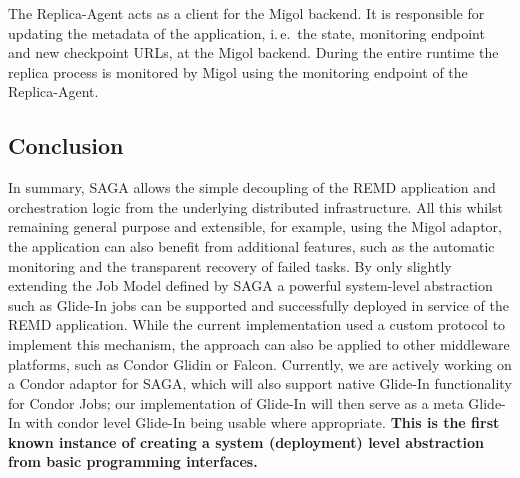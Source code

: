 \documentclass{rspublic}
\newcommand{\glidein}[1]{Glide-In }
\newcommand{\replicaagent}[1]{Replica-Agent }
\begin{document}
The \replicaagent\ acts as a client for the Migol
backend. It is responsible for updating the metadata of the
application, i.\,e.\ the state, monitoring endpoint and new checkpoint
URLs, at the Migol backend. During the entire runtime the replica
process is monitored by Migol using the monitoring endpoint of the
Replica-Agent.
                           

               
\subsection{Conclusion}
In summary, SAGA allows the simple decoupling of the REMD application
and orchestration logic from the underlying distributed
infrastructure. All this whilst remaining general purpose and
extensible, for example, using the Migol adaptor, the application can
also benefit from additional features, such as the automatic
monitoring and the transparent recovery of failed tasks. By only
slightly extending the Job Model defined by SAGA a powerful
system-level abstraction such as \glidein\ jobs can be supported
and successfully deployed in service of the REMD application. While
the current implementation used a custom protocol to implement this
mechanism, the approach can also be applied to other middleware
platforms, such as Condor Glidin or Falcon. Currently, we are actively
working on a Condor adaptor for SAGA, which will also support native
\glidein\ functionality for Condor Jobs; our implementation of
\glidein\ will then serve as a meta \glidein\, with condor level
\glidein\ being usable where appropriate.
{\bf This is the first known instance of creating a system
  (deployment) level abstraction from basic programming interfaces.}
\end{document}
